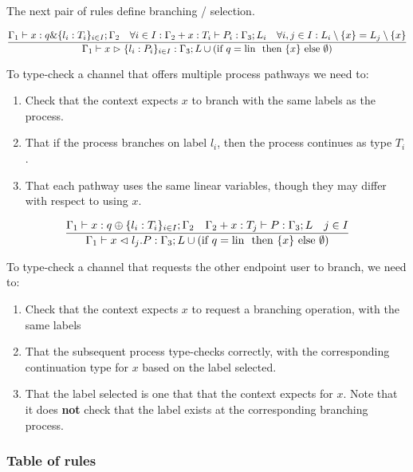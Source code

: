 The next pair of rules define branching / selection.

$$
\frac{\Gamma_1 \vdash x : q \& \{l_i : T_i\}_{i \in I} ; \Gamma_2 \quad \forall{i \in I}:\Gamma_2 + x : T_i \vdash P_i : \Gamma_3 ; L_i \quad \forall{i,j \in I} : L_i \setminus \{x\} = L_j \setminus \{x\}}{\Gamma_1 \vdash x \vartriangleright \{l_i : P_i\}_{i \in I} : \Gamma_3 ; L \cup (\text{if } q = \text{lin } \text{ then } \{x\} \text{ else } \emptyset)} \\
$$

To type-check a channel that offers multiple process pathways we need to:
\begin{enumerate}
    \item Check that the context expects $x$ to branch with the same labels as the process.
    \item That if the process branches on label $l_i$, then the process continues as type $T_i$.
    \item That each pathway uses the same linear variables, though they may differ with respect to using $x$. 
\end{enumerate}

$$
\frac{\Gamma_1 \vdash x : q \oplus \{l_i : T_i\}_{i \in I} ; \Gamma_2 \quad \Gamma_2 + x : T_j \vdash P : \Gamma_3 ; L \quad j \in I}{\Gamma_1 \vdash x \vartriangleleft l_j.P : \Gamma_3 ; L \cup (\text{if } q = \text{lin } \text{ then } \{x\} \text{ else } \emptyset)}
$$

To type-check a channel that requests the other endpoint user to branch, we need to:
\begin{enumerate}
    \item Check that the context expects $x$ to request a branching operation, with the same labels
    \item That the subsequent process type-checks correctly, with the corresponding continuation type for $x$ based on the label selected.
    \item That the label selected is one that that the context expects for $x$. Note that it does \textbf{not} check that the label exists at the corresponding branching process.
\end{enumerate}

\subsubsection{Table of rules}
